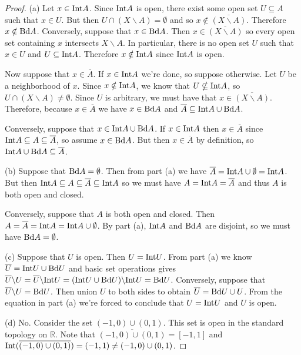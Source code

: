 \documentclass{article}
\newcommand{\bd}{\textup{Bd}}
\newcommand{\intr}{\textup{Int}}
\begin{document}
\begin{proof}
(a) Let $x \in \intr A$. Since $\intr A$ is open, there exist some open set $U \subseteq A$ such that $x \in U$. But then $U \cap (X \backslash A) = \emptyset$ and so $x \notin \overline{(X \backslash A)}$. Therefore $x \notin \bd A$. Conversely, suppose that $x \in \bd A$. Then $x \in \overline{(X \backslash A)}$ so every open set containing $x$ intersects $X \backslash A$. In particular, there is no open set $U$ such that $x \in U$ and $U \subseteq \intr A$. Therefore $x \notin \intr A$ since $\intr A$ is open.

Now suppose that $x \in \overline{A}$. If $x \in \intr A$ we're done, so suppose otherwise. Let $U$ be a neighborhood of $x$. Since $x \notin \intr A$, we know that $U \nsubseteq \intr A$, so $U \cap (X \backslash A) \neq \emptyset$. Since $U$ is arbitrary, we must have that $x \in \overline{(X \backslash A)}$. Therefore, because $x \in \overline{A}$ we have $x \in \bd A$ and $\overline{A} \subseteq \intr A \cup \bd A$.

Conversely, suppose that $x \in \intr A \cup \bd A$. If $x \in \intr A$ then $x \in \overline{A}$ since $\intr A \subseteq A \subseteq \overline{A}$, so assume $x \in \bd A$. But then $x \in \overline{A}$ by definition, so $\intr A \cup \bd A \subseteq \overline{A}$.

(b) Suppose that $\bd A = \emptyset$. Then from part (a) we have $\overline{A} = \intr A \cup \emptyset = \intr A$. But then $\intr A \subseteq A \subseteq \overline{A} \subseteq \intr A$ so we must have $A = \intr A = \overline{A}$ and thus $A$ is both open and closed.

Conversely, suppose that $A$ is both open and closed. Then $A = \overline{A} = \intr A = \intr A \cup \emptyset$. By part (a), $\intr A$ and $\bd A$ are disjoint, so we must have $\bd A = \emptyset$.

(c) Suppose that $U$ is open. Then $U = \intr U$. From part (a) we know $\overline{U} = \intr U \cup \bd U$ and basic set operations gives $\overline{U} \backslash U = \overline{U} \backslash \intr U = (\intr U \cup \bd U) \backslash \intr U = \bd U$. Conversely, suppose that $\overline{U} \backslash U = \bd U$. Then union $U$ to both sides to obtain $\overline{U} = \bd U \cup U$. From the equation in part (a) we're forced to conclude that $U = \intr U$ and $U$ is open.

(d) No. Consider the set $(-1,0) \cup (0,1)$. This set is open in the standard topology on $\mathbb{R}$. Note that $\overline{(-1,0) \cup (0,1)} = [-1,1]$ and $\intr (\overline{(-1,0) \cup (0,1)}) = (-1,1) \neq (-1,0) \cup (0,1)$.
\end{proof}
\end{document}
